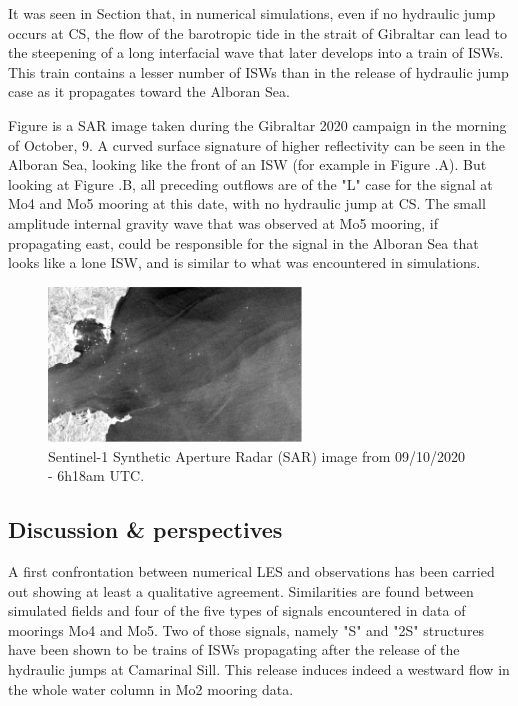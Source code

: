 It was seen in Section  that, in numerical simulations, even if no hydraulic jump occurs at CS, the flow of the barotropic tide in the strait of Gibraltar can lead to the steepening of a long interfacial wave that later develops into a train of ISWs. This train contains a lesser number of ISWs than in the release of hydraulic jump case as it propagates toward the Alboran Sea. 

Figure  is a SAR image taken during the Gibraltar 2020 campaign in the morning of October, 9. A curved surface signature of higher reflectivity can be seen in the Alboran Sea, looking like the front of an ISW (for example in Figure .A). But looking at Figure .B, all preceding outflows are of the "L" case for the signal at Mo4 and Mo5 mooring at this date, with no hydraulic jump at CS. The small amplitude internal gravity wave that was observed at Mo5 mooring, if propagating east, could be responsible for the signal in the Alboran Sea that looks like a lone ISW, and is similar to what was encountered in simulations.

\begin{figure}[!h]
 \centering
 \includegraphics[width=0.6\textwidth]{./GBR3D/SAR_OBS_GEPETO.png}
 \caption [Sentinel-1 SAR image.]{Sentinel-1 Synthetic Aperture Radar (SAR) image from 09/10/2020 - 6h18am UTC.}
 \label{fig_SAROBS}
\end{figure}


\subsection{Discussion \& perspectives}

A first confrontation between numerical LES and observations has been carried out showing at least a qualitative agreement. Similarities are found between simulated fields and four of the five types of signals encountered in data of moorings Mo4 and Mo5. Two of those signals, namely "S" and "2S" structures have been shown to be trains of ISWs propagating after the release of the hydraulic jumps at Camarinal Sill. This release induces indeed a westward flow in the whole water column in Mo2 mooring data. 

